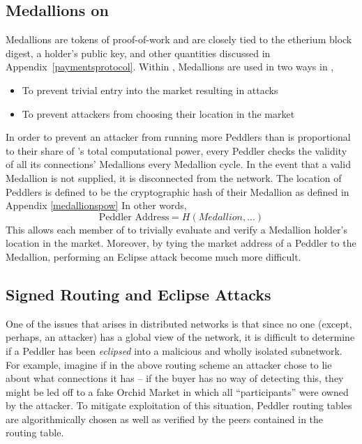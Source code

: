 \subsection{Medallions on \TOM{}}

Medallions are tokens of proof-of-work and are closely tied to the etherium block digest, a holder's public key, and other quantities discussed in Appendix~\ref{paymentsprotocol}. Within \TOM{}, Medallions are used in two ways in \TOM{},
  \begin{itemize}
      \item To prevent trivial entry into the market resulting in attacks 
      \item To prevent attackers from choosing their location in the market
  \end{itemize}
In order to prevent an attacker from running more Peddlers than is proportional to their share of \tOM{}'s total computational power, every Peddler checks the validity of all its connections' Medallions every Medallion cycle. In the event that a valid Medallion is not supplied, it is disconnected from the network. The location of Peddlers is defined to be the cryptographic hash of their Medallion 
as defined in Appendix \ref{medallionspow}
In other words, 
						$$\textrm{Peddler Address} = H(Medallion, ...)$$
This allows each member of \TOM{} to trivially evaluate and verify a Medallion holder's location in the market. Moreover, by tying the market address of a Peddler to the Medallion, performing an Eclipse attack become much more difficult. 

\subsection{Signed Routing and Eclipse Attacks}

One of the issues that arises in distributed networks is that since no one (except, perhaps, an attacker) has a global view of the network, it is difficult to determine if a Peddler has been \textit{eclipsed} into a malicious and wholly isolated subnetwork. For example, imagine if in the above routing scheme an attacker chose to lie about what connections it has – if the buyer has no way of detecting this, they might be led off to a fake Orchid Market in which all “participants” were owned by the attacker. To mitigate exploitation of this situation, Peddler routing tables are algorithmically chosen as well as verified by the peers contained in the routing table.

